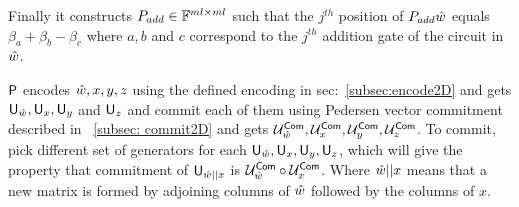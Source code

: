 Finally it constructs $P_{add} \in \mathbb{F}^{ml \times ml}$ such that the $j^{th}$ position of $P_{add} \hat{w}$ equals $\beta_a + \beta_b - \beta_c$ where $a, b$ and $c$ correspond to the $j^{th}$ addition gate of the circuit in $\hat{w}$.

$\mathsf{P}$ encodes $\hat{w} , x, y , z$ using the defined encoding in sec:~\ref{subsec:encode2D} and gets $\mathsf{U}_{\hat{w}}, \mathsf{U}_x, \mathsf{U}_y$ and $\mathsf{U}_z$ and commit each of them using Pedersen vector commitment described in ~\ref{subsec: commit2D} and gets $\mathcal{U}^{\mathsf{Com}}_{\hat{w}}, \mathcal{U}^{\mathsf{Com}}_x, \mathcal{U}^{\mathsf{Com}}_y, \mathcal{U}^{\mathsf{Com}}_z$. To commit, pick different set of generators for each $\mathsf{U}_{\hat{w}}, \mathsf{U}_x, \mathsf{U}_y, \mathsf{U}_z$, which will give the property that commitment of $\mathsf{U}_{\hat{w}||x}$ is $\mathcal{U}^{\mathsf{Com}}_{\hat{w}} \circ \mathcal{U}^{\mathsf{Com}}_x$. Where $\hat{w}||x$ means that a new matrix is formed by adjoining columns of $\hat{w}$ followed by the columns of $x$. 

